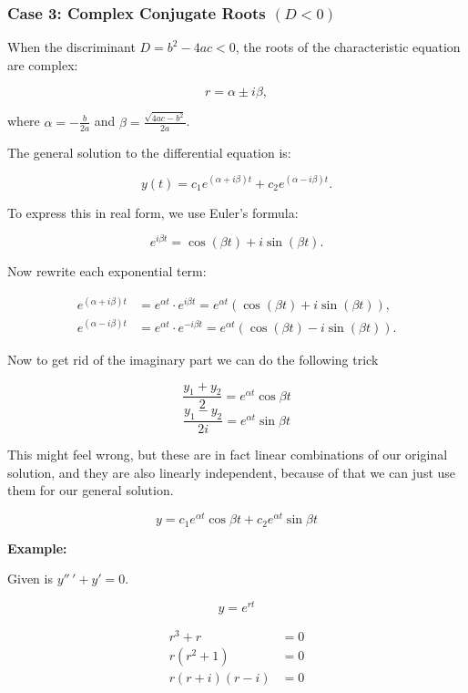 \subsubsection{Case 3: Complex Conjugate Roots \texorpdfstring{\( (D < 0) \)}{}}

When the discriminant \( D = b^2 - 4ac < 0 \), the roots of the characteristic equation are complex:

\[
    r = \alpha \pm i\beta,
\]

where \( \alpha = -\frac{b}{2a} \) and \( \beta = \frac{\sqrt{4ac - b^2}}{2a} \).

The general solution to the differential equation is:

\[
    y(t) = c_1 e^{(\alpha + i\beta)t} + c_2 e^{(\alpha - i\beta)t}.
\]

To express this in real form, we use Euler’s formula:

\[
    e^{i\beta t} = \cos(\beta t) + i\sin(\beta t).
\]

Now rewrite each exponential term:

\begin{align*}
    e^{(\alpha + i\beta)t} &= e^{\alpha t} \cdot e^{i\beta t} = e^{\alpha t} (\cos(\beta t) + i \sin(\beta t)), \\
    e^{(\alpha - i\beta)t} &= e^{\alpha t} \cdot e^{-i\beta t} = e^{\alpha t} (\cos(\beta t) - i \sin(\beta t)).
\end{align*}

Now to get rid of the imaginary part we can do the following trick

\[
    \frac{y_1 + y_2}{2} = e^{\alpha t}\cos\beta t
\]
\[
    \frac{y_1 - y_2}{2i} = e^{\alpha t}\sin\beta t
\]

This might feel wrong, but these are in fact linear combinations of our original solution,
and they are also linearly independent, because of that we can just use them for our general solution.

\[y = c_1 e^{\alpha t}\cos\beta t + c_2  e^{\alpha t}\sin\beta t\]

\textbf{Example:}
\vspace{\baselineskip}

Given is \(y''\,' + y' = 0\).

\[
    y = e^{rt}
\]

\begin{align*}
r^3 + r &= 0\\
r(r^2 + 1) &= 0\\
r(r + i)(r - i) &= 0
\end{align*}


